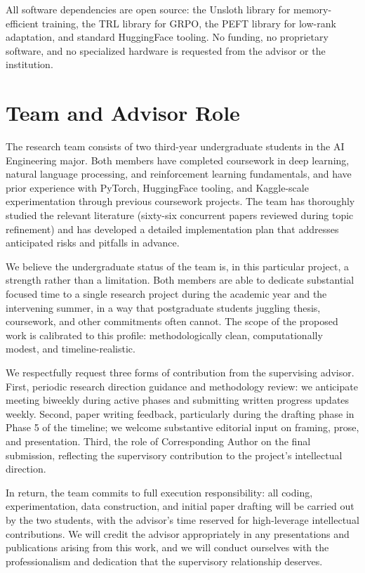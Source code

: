 \documentclass[11pt,a4paper]{article}
\begin{document}
All software dependencies are open source: the Unsloth library for memory-efficient training, the TRL library for GRPO, the PEFT library for low-rank adaptation, and standard HuggingFace tooling. No funding, no proprietary software, and no specialized hardware is requested from the advisor or the institution.

\section{Team and Advisor Role}

The research team consists of two third-year undergraduate students in the AI Engineering major. Both members have completed coursework in deep learning, natural language processing, and reinforcement learning fundamentals, and have prior experience with PyTorch, HuggingFace tooling, and Kaggle-scale experimentation through previous coursework projects. The team has thoroughly studied the relevant literature (sixty-six concurrent papers reviewed during topic refinement) and has developed a detailed implementation plan that addresses anticipated risks and pitfalls in advance.

We believe the undergraduate status of the team is, in this particular project, a strength rather than a limitation. Both members are able to dedicate substantial focused time to a single research project during the academic year and the intervening summer, in a way that postgraduate students juggling thesis, coursework, and other commitments often cannot. The scope of the proposed work is calibrated to this profile: methodologically clean, computationally modest, and timeline-realistic.

We respectfully request three forms of contribution from the supervising advisor. First, periodic research direction guidance and methodology review: we anticipate meeting biweekly during active phases and submitting written progress updates weekly. Second, paper writing feedback, particularly during the drafting phase in Phase 5 of the timeline; we welcome substantive editorial input on framing, prose, and presentation. Third, the role of Corresponding Author on the final submission, reflecting the supervisory contribution to the project's intellectual direction.

In return, the team commits to full execution responsibility: all coding, experimentation, data construction, and initial paper drafting will be carried out by the two students, with the advisor's time reserved for high-leverage intellectual contributions. We will credit the advisor appropriately in any presentations and publications arising from this work, and we will conduct ourselves with the professionalism and dedication that the supervisory relationship deserves.
\end{document}
